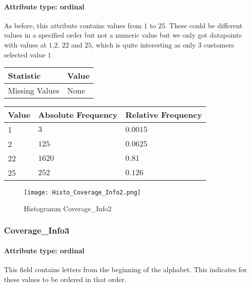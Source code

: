 \paragraph{Attribute type: ordinal}As before, this attribute contains values from $1$ to $25$.  These could be different values in a specified order but not a numeric value but we only got datapoints with values at $1$,$2$, $22$ and $25$, which is quite interesting as only $3$ customers selected value $1$

\begin{table}[H]
	\renewcommand{\arraystretch}{1.25}
	\begin{tabular}{l|l}
		\textbf{Statistic} & \textbf{Value}\\\hline
		Missing Values& None\\\hline
	\end{tabular}
\end{table}
\begin{table}[H]
	\renewcommand{\arraystretch}{1.25}
	\begin{tabular}{l|l|l}
		\textbf{Value} & \textbf{Absolute Frequency} & \textbf{Relative Frequency}\\\hline
		1&$3$&$0.0015$\\\hline
		2&$125$&$0.0625$\\\hline
		22&$1620$&$0.81$\\\hline
		25&$252$&$0.126$\\\hline
	\end{tabular}
\end{table}

\begin{figure}[H]
	\begin{center}
		\texttt{[image: Histo\_Coverage\_Info2.png]}
	\end{center}
	\caption{Histogramm Coverage\_Info2}
\end{figure}

\subsubsection{Coverage\_Info3}
\paragraph{Attribute type: ordinal} This field contains letters from the beginning of the alphabet. This indicates for these values to be ordered in that order.

